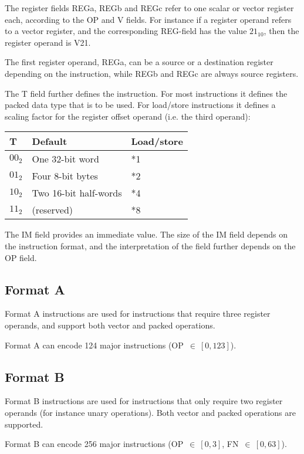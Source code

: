 The register fields REGa, REGb and REGc refer to one scalar or vector register
each, according to the OP and V fields. For instance if a register operand
refers to a vector register, and the corresponding REG-field has the
value $21_{10}$, then the register operand is V21.

The first register operand, REGa, can be a source or a destination register
depending on the instruction, while REGb and REGc are always source registers.

The T field further defines the instruction. For most instructions it defines
the packed data type that is to be used. For load/store instructions it
defines a scaling factor for the register offset operand (i.e. the third
operand):

\begin{tabular}{|l|l|l|}
  \hline
  \textbf{T} & \textbf{Default} & \textbf{Load/store} \\
  \hline
  $00_{2}$ & One 32-bit word & *1 \\
  \hline
  $01_{2}$ & Four 8-bit bytes & *2 \\
  \hline
  $10_{2}$ & Two 16-bit half-words & *4 \\
  \hline
  $11_{2}$ & (reserved) & *8 \\
  \hline
\end{tabular}

The IM field provides an immediate value. The size of the IM field depends on
the instruction format, and the interpretation of the field further depends on
the OP field.

\subsection{Format A}

Format A instructions are used for instructions that require three register
operands, and support both vector and packed operations.

Format A can encode 124 major instructions (OP~$\in~[0,123]$).

\subsection{Format B}

Format B instructions are used for instructions that only require two register
operands (for instance unary operations). Both vector and packed operations are
supported.

Format B can encode 256 major instructions (OP~$\in~[0,3]$, FN~$\in~[0,63]$).

